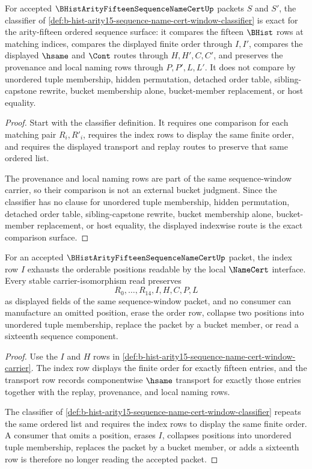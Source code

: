 \begin{theorem}
\label{thm:b-hist-arity15-sequence-name-cert-classifier-exactness}
For accepted $\BHistArityFifteenSequenceNameCertUp$ packets $S$ and $S'$, the classifier of \autoref{def:b-hist-arity15-sequence-name-cert-window-classifier} is exact for the arity-fifteen ordered sequence surface: it compares the fifteen $\BHist$ rows at matching indices, compares the displayed finite order through $I,I'$, compares the displayed $\hsame$ and $\Cont$ routes through $H,H',C,C'$, and preserves the provenance and local naming rows through $P,P',L,L'$. It does not compare by unordered tuple membership, hidden permutation, detached order table, sibling-capstone rewrite, bucket membership alone, bucket-member replacement, or host equality.
\end{theorem}
\begin{proof}
Start with the classifier definition. It requires one comparison for each matching pair $R_i,R'_i$, requires the index rows to display the same finite order, and requires the displayed transport and replay routes to preserve that same ordered list.

The provenance and local naming rows are part of the same sequence-window carrier, so their comparison is not an external bucket judgment. Since the classifier has no clause for unordered tuple membership, hidden permutation, detached order table, sibling-capstone rewrite, bucket membership alone, bucket-member replacement, or host equality, the displayed indexwise route is the exact comparison surface.
\end{proof}

\begin{theorem}
\label{thm:b-hist-arity15-sequence-name-cert-index-exhaustion}
For an accepted $\BHistArityFifteenSequenceNameCertUp$ packet, the index row $I$ exhausts the orderable positions readable by the local $\NameCert$ interface. Every stable carrier-isomorphism read preserves
$$
R_0,\ldots,R_{14},I,H,C,P,L
$$
as displayed fields of the same sequence-window packet, and no consumer can manufacture an omitted position, erase the order row, collapse two positions into unordered tuple membership, replace the packet by a bucket member, or read a sixteenth sequence component.
\end{theorem}
\begin{proof}
Use the $I$ and $H$ rows in \autoref{def:b-hist-arity15-sequence-name-cert-window-carrier}. The index row displays the finite order for exactly fifteen entries, and the transport row records componentwise $\hsame$ transport for exactly those entries together with the replay, provenance, and local naming rows.

The classifier of \autoref{def:b-hist-arity15-sequence-name-cert-window-classifier} repeats the same ordered list and requires the index rows to display the same finite order. A consumer that omits a position, erases $I$, collapses positions into unordered tuple membership, replaces the packet by a bucket member, or adds a sixteenth row is therefore no longer reading the accepted packet.
\end{proof}

